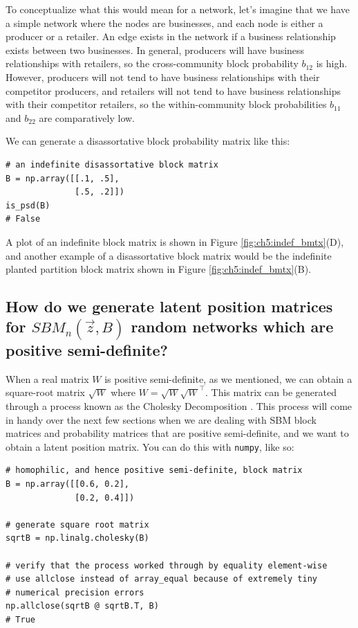 To conceptualize what this would mean for a network, let's imagine that we have a simple network where the nodes are businesses, and each node is either a producer or a retailer. An edge exists in the network if a business relationship exists between two businesses. In general, producers will have business relationships with retailers, so the cross-community block probability $b_{12}$ is high. However, producers will not tend to have business relationships with their competitor producers, and retailers will not tend to have business relationships with their competitor retailers, so the within-community block probabilities $b_{11}$ and $b_{22}$ are comparatively low.

We can generate a disassortative block probability matrix like this:
\begin{lstlisting}[style=python]
# an indefinite disassortative block matrix
B = np.array([[.1, .5], 
              [.5, .2]])
is_psd(B)
# False
\end{lstlisting}

A plot of an indefinite block matrix is shown in Figure \ref{fig:ch5:indef_bmtx}(D), and another example of a disassortative block matrix would be the indefinite planted partition block matrix shown in Figure \ref{fig:ch5:indef_bmtx}(B).

\subsection{How do we generate latent position matrices for $SBM_n(\vec z, B)$ random networks which are positive semi-definite?}
\label{sec:ch5:psd_block:lpm_fromsbm}
When a real matrix $W$ is positive semi-definite, as we mentioned, we can obtain a square-root matrix $\sqrt W$ where $W = \sqrt{W}\sqrt{W}^\top$. This matrix can be generated through a process known as the {Cholesky Decomposition} \cite{Horn2012Oct}. This process will come in handy over the next few sections when we are dealing with SBM block matrices and probability matrices that are positive semi-definite, and we want to obtain a latent position matrix. You can do this with \texttt{numpy}, like so:

\begin{lstlisting}[style=python]
# homophilic, and hence positive semi-definite, block matrix
B = np.array([[0.6, 0.2], 
              [0.2, 0.4]])

# generate square root matrix
sqrtB = np.linalg.cholesky(B)

# verify that the process worked through by equality element-wise
# use allclose instead of array_equal because of extremely tiny
# numerical precision errors
np.allclose(sqrtB @ sqrtB.T, B)
# True
\end{lstlisting}

